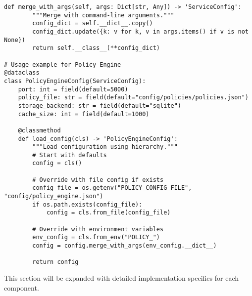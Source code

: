 \begin{lstlisting}[style=pythoncode, caption=Configuration Management Implementation]
    def merge_with_args(self, args: Dict[str, Any]) -> 'ServiceConfig':
        """Merge with command-line arguments."""
        config_dict = self.__dict__.copy()
        config_dict.update({k: v for k, v in args.items() if v is not None})
        return self.__class__(**config_dict)

# Usage example for Policy Engine
@dataclass
class PolicyEngineConfig(ServiceConfig):
    port: int = field(default=5000)
    policy_file: str = field(default="config/policies/policies.json")
    storage_backend: str = field(default="sqlite")
    cache_size: int = field(default=1000)
    
    @classmethod
    def load_config(cls) -> 'PolicyEngineConfig':
        """Load configuration using hierarchy."""
        # Start with defaults
        config = cls()
        
        # Override with file config if exists
        config_file = os.getenv("POLICY_CONFIG_FILE", "config/policy_engine.json")
        if os.path.exists(config_file):
            config = cls.from_file(config_file)
        
        # Override with environment variables
        env_config = cls.from_env("POLICY_")
        config = config.merge_with_args(env_config.__dict__)
        
        return config
\end{lstlisting}


This section will be expanded with detailed implementation specifics for each component.
